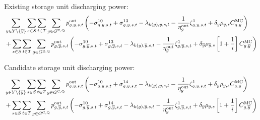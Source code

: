 \documentclass{article}
\begin{document}
Existing storage unit discharging power:
\begin{align}
	& \sum\limits_{\iYear \in \sYears \setminus \{\iYearTerminal\}}\sum\limits_{\iScenario \in \sScenarios}\sum\limits_{\iInterval \in \sIntervals 
	} \sum\limits_{\iGenerator \in \sStorageExisting} \vPowerOut \left( - \dNonNegativeDischarging + \dMaxDischargingRateExisting - \dPowerBalance[k(\iGenerator),\iYear,\iScenario,\iInterval] - \frac{1}{\cStorageUnitEfficiencyDischarging} \dStorageEnergyTransition + \cDiscountRate \cScenarioDuration \cMarginalCost \right) \nonumber\\
	& + \sum\limits_{\iScenario \in \sScenarios}\sum\limits_{\iInterval \in \sIntervals 
} \sum\limits_{\iGenerator \in \sStorageExisting} \vPowerOut[\iGenerator,\iYearTerminal,\iScenario,\iInterval] \left( - \dNonNegativeDischarging[\iGenerator,\iYearTerminal,\iScenario,\iInterval] + \dMaxDischargingRateExisting[\iGenerator,\iYearTerminal,\iScenario,\iInterval] - \dPowerBalance[k(\iGenerator),\iYearTerminal,\iScenario,\iInterval] - \frac{1}{\cStorageUnitEfficiencyDischarging} \dStorageEnergyTransition[\iGenerator,\iYearTerminal,\iScenario,\iInterval] + \cDiscountRate[\iYearTerminal] \cScenarioDuration[\iYearTerminal,\iScenario] \left[1 + \frac{1}{\cInterestRate}\right] \cMarginalCost[\iGenerator,\iYearTerminal] \right) \nonumber\\
\end{align}

Candidate storage unit discharging power:
\begin{align}
	& \sum\limits_{\iYear \in \sYears \setminus \{\iYearTerminal\}}\sum\limits_{\iScenario \in \sScenarios} \sum\limits_{\iInterval \in \sIntervals 
	} \sum\limits_{\iGenerator \in \sStorageCandidate} \vPowerOut \left( - \dNonNegativeDischarging + \dMaxDischargingRateCandidate - \dPowerBalance[k(\iGenerator),\iYear,\iScenario,\iInterval] - \frac{1}{\cStorageUnitEfficiencyDischarging} \dStorageEnergyTransition + \cDiscountRate \cScenarioDuration \cMarginalCost \right) \nonumber \\ 
	& + \sum\limits_{\iScenario \in \sScenarios}\sum\limits_{\iInterval \in \sIntervals 
} \sum\limits_{\iGenerator \in \sStorageCandidate} \vPowerOut[\iGenerator,\iYearTerminal,\iScenario,\iInterval] \left( - \dNonNegativeDischarging[\iGenerator,\iYearTerminal,\iScenario,\iInterval] + \dMaxDischargingRateCandidate[\iGenerator,\iYearTerminal,\iScenario,\iInterval] - \dPowerBalance[k(\iGenerator),\iYearTerminal,\iScenario,\iInterval] - \frac{1}{\cStorageUnitEfficiencyDischarging} \dStorageEnergyTransition[\iGenerator,\iYearTerminal,\iScenario,\iInterval] + \cDiscountRate[\iYearTerminal] \cScenarioDuration[\iYearTerminal,\iScenario] \left[1 + \frac{1}{\cInterestRate}\right] \cMarginalCost[\iGenerator,\iYearTerminal] \right) \nonumber\\
\end{align}
\end{document}
